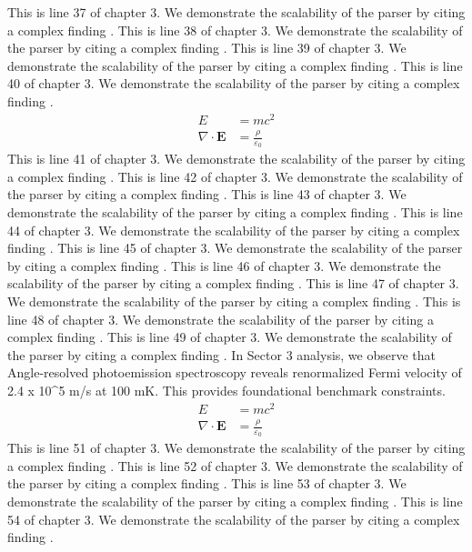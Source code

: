 This is line 37 of chapter 3. We demonstrate the scalability of the parser by citing a complex finding \cite{ref3_37}.
This is line 38 of chapter 3. We demonstrate the scalability of the parser by citing a complex finding \cite{ref3_38}.
This is line 39 of chapter 3. We demonstrate the scalability of the parser by citing a complex finding \cite{ref3_39}.
This is line 40 of chapter 3. We demonstrate the scalability of the parser by citing a complex finding \cite{ref3_40}.
\begin{align*}
  E &= mc^2 \\
  \nabla \cdot \mathbf{E} &= \frac{\rho}{\varepsilon_0}
\end{align*}
This is line 41 of chapter 3. We demonstrate the scalability of the parser by citing a complex finding \cite{ref3_41}.
This is line 42 of chapter 3. We demonstrate the scalability of the parser by citing a complex finding \cite{ref3_42}.
This is line 43 of chapter 3. We demonstrate the scalability of the parser by citing a complex finding \cite{ref3_43}.
This is line 44 of chapter 3. We demonstrate the scalability of the parser by citing a complex finding \cite{ref3_44}.
This is line 45 of chapter 3. We demonstrate the scalability of the parser by citing a complex finding \cite{ref3_45}.
This is line 46 of chapter 3. We demonstrate the scalability of the parser by citing a complex finding \cite{ref3_46}.
This is line 47 of chapter 3. We demonstrate the scalability of the parser by citing a complex finding \cite{ref3_47}.
This is line 48 of chapter 3. We demonstrate the scalability of the parser by citing a complex finding \cite{ref3_48}.
This is line 49 of chapter 3. We demonstrate the scalability of the parser by citing a complex finding \cite{ref3_49}.
In Sector 3 analysis, we observe that Angle-resolved photoemission spectroscopy reveals renormalized Fermi velocity of 2.4 x 10^5 m/s at 100 mK. This provides foundational benchmark constraints.
\begin{align*}
  E &= mc^2 \\
  \nabla \cdot \mathbf{E} &= \frac{\rho}{\varepsilon_0}
\end{align*}
This is line 51 of chapter 3. We demonstrate the scalability of the parser by citing a complex finding \cite{ref3_51}.
This is line 52 of chapter 3. We demonstrate the scalability of the parser by citing a complex finding \cite{ref3_52}.
This is line 53 of chapter 3. We demonstrate the scalability of the parser by citing a complex finding \cite{ref3_53}.
This is line 54 of chapter 3. We demonstrate the scalability of the parser by citing a complex finding \cite{ref3_54}.
